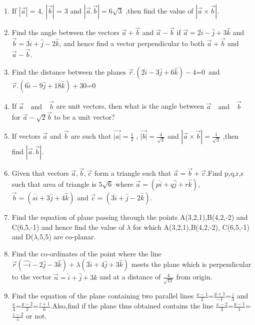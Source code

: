 \begin{enumerate}
	\item If $|\overrightarrow{a}|$ = 4, $|\overrightarrow{b}|$ = 3 and
	      $|\overrightarrow{a}.\overrightarrow{b}|  = 6\sqrt{3}$ ,then  find  the  value  of  $|\overrightarrow{a}\times \overrightarrow{b}|.$
	\item Find the angle between the vectors $\vec{a}+\vec{b}$ and $\vec{a}-\vec{b}$ if $\vec{a} = 2\hat{i}-\hat{j}+3\hat{k}$ and $\vec{b} = 3\hat{i}+\hat{j}-2\hat{k}$, and hence find a vector perpendicular to both $\vec{a}+\vec{b}$ and $\vec{a}-\vec{b}$.
	\item Find the distance between the planes $\vec{r}.(2\hat{i}-3\hat{j}+6\hat{k})-4$=0\
	      {and} $ \vec{r}.(6\hat{i}-9\hat{j}+18\hat{k})+30$=0\\
	\item If $\Vec{a} \quad \text{and}\quad \vec{b} $ are unit vectors, then what is the angle between $\Vec{a} \quad \text{and}\quad \vec{b} $ for $\vec{a}-\sqrt{2}\vec{b}$ to be a unit vector?\\
	\item If vectors $\vec{a}$ {and} $\vec{b}$ are such that $\vec{|a|}= \frac{1}{2}$ ,  $\vec{|b|}= \frac{4}{\sqrt{3}}$ and $|\vec{a} \times \vec{b}|=\frac{1}{\sqrt{3}}$ ,then find $|\vec{a}.\vec{b}|$.\\
	\item Given that vectors $\overrightarrow{a},\overrightarrow{b},\overrightarrow{c}$ form a triangle such that $\overrightarrow{a}=\overrightarrow{b}+\overrightarrow{c}$.Find p,q,r,s such that area of triangle is $5\sqrt{6}$ where $\overrightarrow{a}=(p\hat{i}+q\hat{j}+r\hat{k})$, $\overrightarrow{b}=(s\hat{i}+3\hat{j}+4\hat{k})$ and $\overrightarrow{c}=(3\hat{i}+\hat{j}-2\hat{k})$.\\
	\item Find the equation of plane passing through the points A(3,2,1),B(4,2,-2) and C(6,5,-1) and hence find the value of $\lambda$ for which A(3,2,1),B(4,2,-2), C(6,5,-1) and D($\lambda$,5,5) are co-planar.
	\item Find the co-ordinates of the point where the line $\overrightarrow{r}(\hat{-i}-2\hat{j}-3\hat{k})+\lambda(3\hat{i}+4\hat{j}+3
		      \hat{k})$ meets the plane which is perpendicular to the vector $\overrightarrow{n}=\hat{i}+\hat{j}+3\hat{k}$ and at a distance of $\frac{4}{\sqrt{11}}$ from origin.
	\item Find the equation of the plane containing two parallel lines $\frac{x-1}{2}$=$\frac{y+1}{-1}$=$\frac{z}{3}$ and $\frac{x}{4}$=$\frac{y-2}{2}$=$\frac{z+1}{6}$.Also,find if the plane thus obtained contains the line $\frac{x-2}{3}$=$\frac{y-1}{1}$=$\frac{z-2}{5}$ or not.\\

\end{enumerate}
